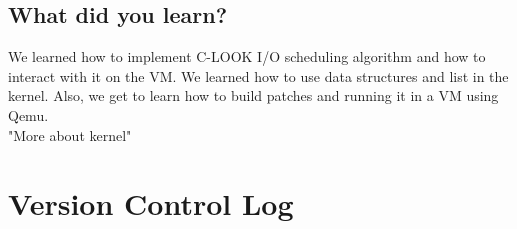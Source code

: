 \documentclass[onecolumn, draftclsnofoot,10pt, compsoc]{IEEEtran}
\begin{document}
\subsection{What did you learn?}
\noindent 
We learned how to implement C-LOOK I/O scheduling algorithm and how to interact with it on the VM. We learned how to use data structures and list in the kernel. Also, we get to learn how to build patches and running it in a VM using Qemu. \\

\noindent 
"More about kernel" 
\\

\section{Version Control Log}
\end{document}
